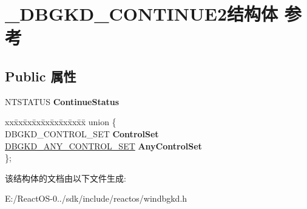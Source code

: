 \hypertarget{struct___d_b_g_k_d___c_o_n_t_i_n_u_e2}{}\section{\+\_\+\+D\+B\+G\+K\+D\+\_\+\+C\+O\+N\+T\+I\+N\+U\+E2结构体 参考}
\label{struct___d_b_g_k_d___c_o_n_t_i_n_u_e2}
\subsection*{Public 属性}
\begin{DoxyCompactItemize}
\item 
\mbox{\label{struct___d_b_g_k_d___c_o_n_t_i_n_u_e2_a81b782f21782e7ae7f2e995c18509797}} 
N\+T\+S\+T\+A\+T\+US {\bfseries Continue\+Status}
\item 
\mbox{\label{struct___d_b_g_k_d___c_o_n_t_i_n_u_e2_a557f384ad50b5d75619abdd84f298c62}} 
\begin{tabbing}
xx\=xx\=xx\=xx\=xx\=xx\=xx\=xx\=xx\=\kill
union \{\\
\>DBGKD\_CONTROL\_SET {\bfseries ControlSet}\\
\>\hyperlink{struct___d_b_g_k_d___a_n_y___c_o_n_t_r_o_l___s_e_t}{DBGKD\_ANY\_CONTROL\_SET} {\bfseries AnyControlSet}\\
\}; \\

\end{tabbing}\end{DoxyCompactItemize}


该结构体的文档由以下文件生成\+:\begin{DoxyCompactItemize}
\item 
E\+:/\+React\+O\+S-\/0../sdk/include/reactos/windbgkd.\+h\end{DoxyCompactItemize}
